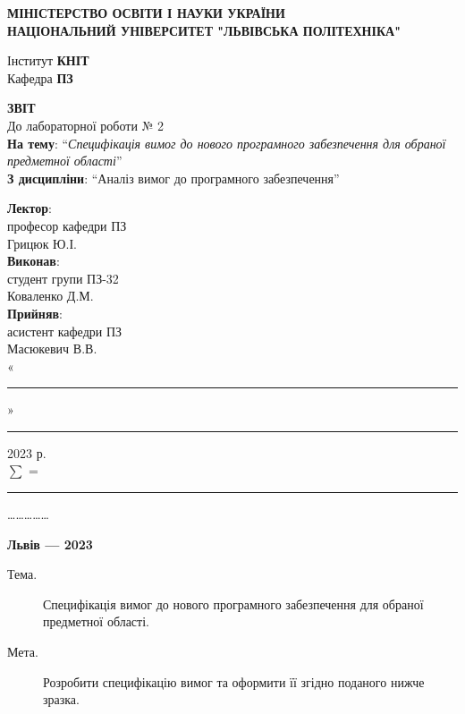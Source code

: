 \documentclass[14pt]{extreport}
\newcommand\subject{Аналіз вимог до програмного забезпечення}
\newcommand\lecturer{професор кафедри ПЗ\\Грицюк Ю.І.}
\newcommand\teacher{асистент кафедри ПЗ\\Масюкевич В.В.}
\newcommand\mygroup{ПЗ-32}
\newcommand\lab{2}
\newcommand\theme{Специфікація вимог до нового програмного забезпечення для обраної
	предметної області}
\newcommand\purpose{Розробити специфікацію вимог та оформити її згідно поданого
	нижче зразка}
\begin{document}
\begin{normalsize}
	\begin{titlepage}
		\thispagestyle{empty}
		\begin{center}
			\textbf{МІНІСТЕРСТВО ОСВІТИ І НАУКИ УКРАЇНИ\\
				НАЦІОНАЛЬНИЙ УНІВЕРСИТЕТ "ЛЬВІВСЬКА ПОЛІТЕХНІКА"}
		\end{center}
		\begin{flushright}
			Інститут \textbf{КНІТ}\\
			Кафедра \textbf{ПЗ}
		\end{flushright}
		\vspace{140pt}
		\begin{center}
			\textbf{ЗВІТ}\\
			\vspace{10pt}
			До лабораторної роботи № \lab\\
			\textbf{На тему}: “\textit{\theme}”\\
			\textbf{З дисципліни}: “\subject”
		\end{center}
		\vspace{40pt}
		\begin{flushright}
			
			\textbf{Лектор}:\\
			\lecturer\\
			\vspace{10pt}
			\textbf{Виконав}:\\
			
			студент групи \mygroup\\
			Коваленко Д.М.\\
			\vspace{10pt}
			\textbf{Прийняв}:\\
			
			\teacher\\
			
			\vspace{28pt}
			«\rule{1cm}{0.15mm}» \rule{1.5cm}{0.15mm} 2023 р.\\
			$\sum$ = \rule{1cm}{0.15mm}……………\\
			
		\end{flushright}
		\vspace{\fill}
		\begin{center}
			\textbf{Львів — 2023}
		\end{center}
	\end{titlepage}
		
	\begin{description}
		\item[Тема.] \theme.
		\item[Мета.] \purpose.
	\end{description}


\end{normalsize}
\end{document}
